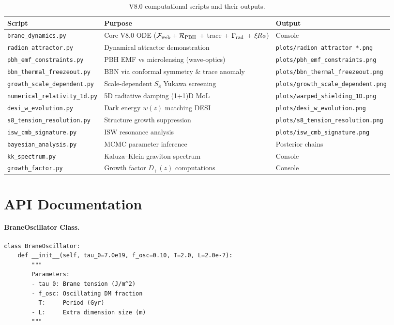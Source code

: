 \begin{table}[h]
\centering
\small
\caption{V8.0 computational scripts and their outputs.}
\label{tab:scripts}
\begin{tabular}{@{}p{4.2cm}p{6.5cm}p{3.5cm}@{}}
\toprule
\textbf{Script} & \textbf{Purpose} & \textbf{Output} \\
\midrule
\texttt{brane\_dynamics.py} & Core V8.0 ODE ($\mathcal{F}_\text{web} + \mathcal{R}_\text{PBH}$ + trace + $\Gamma_\text{rad}$ + $\xi R\phi$) & Console \\
\texttt{radion\_attractor.py} & Dynamical attractor demonstration & \texttt{plots/radion\_attractor\_*.png} \\
\texttt{pbh\_emf\_constraints.py} & PBH EMF vs microlensing (wave-optics) & \texttt{plots/pbh\_emf\_constraints.png} \\
\texttt{bbn\_thermal\_freezeout.py} & BBN via conformal symmetry \& trace anomaly & \texttt{plots/bbn\_thermal\_freezeout.png} \\
\texttt{growth\_scale\_dependent.py} & Scale-dependent $S_8$ Yukawa screening & \texttt{plots/growth\_scale\_dependent.png} \\
\texttt{numerical\_relativity\_1d.py} & 5D radiative damping (1+1)D MoL & \texttt{plots/warped\_shielding\_1D.png} \\
\texttt{desi\_w\_evolution.py} & Dark energy $w(z)$ matching DESI & \texttt{plots/desi\_w\_evolution.png} \\
\texttt{s8\_tension\_resolution.py} & Structure growth suppression & \texttt{plots/s8\_tension\_resolution.png} \\
\texttt{isw\_cmb\_signature.py} & ISW resonance analysis & \texttt{plots/isw\_cmb\_signature.png} \\
\texttt{bayesian\_analysis.py} & MCMC parameter inference & Posterior chains \\
\texttt{kk\_spectrum.py} & Kaluza--Klein graviton spectrum & Console \\
\texttt{growth\_factor.py} & Growth factor $D_+(z)$ computations & Console \\
\bottomrule
\end{tabular}
\end{table}

\section{API Documentation}
\label{sec:api}

\paragraph{BraneOscillator Class.}
\begin{verbatim}
class BraneOscillator:
    def __init__(self, tau_0=7.0e19, f_osc=0.10, T=2.0, L=2.0e-7):
        """
        Parameters:
        - tau_0: Brane tension (J/m^2)
        - f_osc: Oscillating DM fraction
        - T:     Period (Gyr)
        - L:     Extra dimension size (m)
        """
\end{verbatim}

